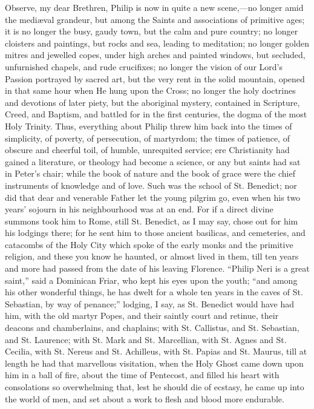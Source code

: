 Observe, my dear Brethren, Philip is now in quite a
new scene,—no longer amid the mediæval grandeur,
but among the Saints and associations of primitive ages;
it is no longer the busy, gaudy town, but the calm and
pure country; no longer cloisters and paintings, but
rocks and sea, leading to meditation; no longer golden
mitres and jewelled copes, under high arches and painted
windows, but secluded, unfurnished chapels, and rude
crucifixes; no longer the vision of our Lord's Passion
portrayed by sacred art, but the very rent in the solid
mountain, opened in that same hour when He hung upon the
Cross; no longer the holy doctrines and devotions of
later piety, but the aboriginal mystery, contained in
Scripture, Creed, and Baptism, and battled for in the
first centuries, the dogma of the most Holy Trinity.
Thus, everything about Philip threw him back into the
times of simplicity, of poverty, of persecution, of
martyrdom; the times of patience, of obscure and cheerful
toil, of humble, unrequited service; ere Christianity had
gained a literature, or theology had become a science, or
any but saints had sat in Peter's chair; while the book
of nature and the book of grace were the chief
instruments of knowledge and of love. Such was the school
of St. Benedict; nor did that dear and venerable Father
let the young pilgrim go, even when his two years'
sojourn in his neighbourhood was at an end. For if a
direct divine summons took him to Rome, still St.
Benedict, as I may say, chose out for him his lodgings
there; for he sent him to those ancient basilicas, and
cemeteries, and catacombs of the Holy City which spoke of
the early monks and the primitive religion, and these you
know he haunted, or almost lived in them, till ten years
and more had passed from the date of his leaving
Florence. ``Philip Neri is a great saint,'' said
a Dominican Friar, who kept his eyes upon the youth;
``and among his other wonderful things, he has dwelt
for a whole ten years in the caves of St. Sebastian, by
way of penance;'' lodging, I say, as St. Benedict
would have had him, with the old martyr Popes, and their
saintly court and retinue, their deacons and
chamberlains, and chaplains; with St. Callistus, and St.
Sebastian, and St. Laurence; with St. Mark and St.
Marcellian, with St. Agnes and St. Cecilia, with St.
Nereus and St. Achilleus, with St. Papias and St. Maurus,
till at length he had that marvellous visitation, when
the Holy Ghost came down upon him in a ball of fire,
about the time of Pentecost, and filled his heart with
consolations so overwhelming that, lest he should die of
ecstasy, he came up into the world of men, and set about
a work to flesh and blood more endurable.

